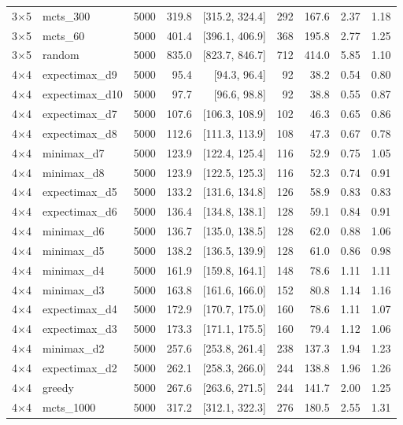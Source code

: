 {\begin{longtable}{llrrrrrrr}
3$\times$5 & mcts\_300 & 5000 & 319.8 & [315.2, 324.4] & 292 & 167.6 & 2.37 & 1.18 \\
3$\times$5 & mcts\_60 & 5000 & 401.4 & [396.1, 406.9] & 368 & 195.8 & 2.77 & 1.25 \\
3$\times$5 & random & 5000 & 835.0 & [823.7, 846.7] & 712 & 414.0 & 5.85 & 1.10 \\
\midrule
4$\times$4 & expectimax\_d9 & 5000 & 95.4 & [94.3, 96.4] & 92 & 38.2 & 0.54 & 0.80 \\
4$\times$4 & expectimax\_d10 & 5000 & 97.7 & [96.6, 98.8] & 92 & 38.8 & 0.55 & 0.87 \\
4$\times$4 & expectimax\_d7 & 5000 & 107.6 & [106.3, 108.9] & 102 & 46.3 & 0.65 & 0.86 \\
4$\times$4 & expectimax\_d8 & 5000 & 112.6 & [111.3, 113.9] & 108 & 47.3 & 0.67 & 0.78 \\
4$\times$4 & minimax\_d7 & 5000 & 123.9 & [122.4, 125.4] & 116 & 52.9 & 0.75 & 1.05 \\
4$\times$4 & minimax\_d8 & 5000 & 123.9 & [122.5, 125.3] & 116 & 52.3 & 0.74 & 0.91 \\
4$\times$4 & expectimax\_d5 & 5000 & 133.2 & [131.6, 134.8] & 126 & 58.9 & 0.83 & 0.83 \\
4$\times$4 & expectimax\_d6 & 5000 & 136.4 & [134.8, 138.1] & 128 & 59.1 & 0.84 & 0.91 \\
4$\times$4 & minimax\_d6 & 5000 & 136.7 & [135.0, 138.5] & 128 & 62.0 & 0.88 & 1.06 \\
4$\times$4 & minimax\_d5 & 5000 & 138.2 & [136.5, 139.9] & 128 & 61.0 & 0.86 & 0.98 \\
4$\times$4 & minimax\_d4 & 5000 & 161.9 & [159.8, 164.1] & 148 & 78.6 & 1.11 & 1.11 \\
4$\times$4 & minimax\_d3 & 5000 & 163.8 & [161.6, 166.0] & 152 & 80.8 & 1.14 & 1.16 \\
4$\times$4 & expectimax\_d4 & 5000 & 172.9 & [170.7, 175.0] & 160 & 78.6 & 1.11 & 1.07 \\
4$\times$4 & expectimax\_d3 & 5000 & 173.3 & [171.1, 175.5] & 160 & 79.4 & 1.12 & 1.06 \\
4$\times$4 & minimax\_d2 & 5000 & 257.6 & [253.8, 261.4] & 238 & 137.3 & 1.94 & 1.23 \\
4$\times$4 & expectimax\_d2 & 5000 & 262.1 & [258.3, 266.0] & 244 & 138.8 & 1.96 & 1.26 \\
4$\times$4 & greedy & 5000 & 267.6 & [263.6, 271.5] & 244 & 141.7 & 2.00 & 1.25 \\
4$\times$4 & mcts\_1000 & 5000 & 317.2 & [312.1, 322.3] & 276 & 180.5 & 2.55 & 1.31 \\

\end{longtable}}
